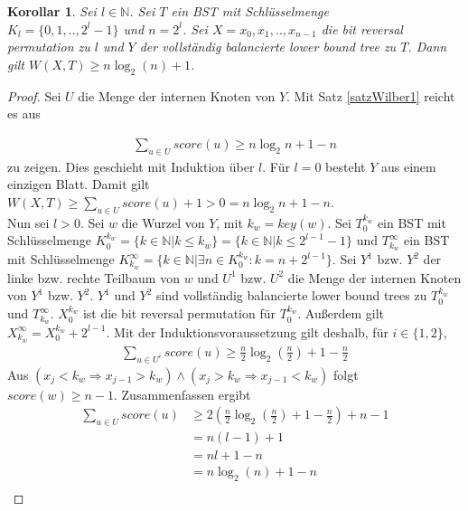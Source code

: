 \documentclass[a4paper,12pt]{article}
\begin{document}
\newtheorem{Korollar1}{Korollar}[section]
\begin{Korollar1} Sei $l \in \mathbb{N}$. Sei $T$ ein BST mit Schlüsselmenge\\ ${K_l = \{0,1,..,2^l -1\}}$ und $n = 2^l$. Sei $X = x_0, x_1,..,x_{n-1}$ die bit reversal permutation zu $l$ und $Y$ der vollständig balancierte lower bound tree zu $T$. Dann gilt  $W\left(X,T\right) \geq n \log_2 \left(n\right) + 1 $. 
\end{Korollar1}
\begin{proof}
	Sei $U$ die Menge der internen Knoten von $Y$. Mit Satz \ref{satzWilber1} reicht es aus 
	
	\begin{align*}
	\sum_{u \in U} {\mathit{score}\left(u\right)} \geq n \log_2 n + 1 - n 
	\end{align*} 
	zu zeigen. Dies geschieht mit Induktion über $l$. Für $l = 0$ besteht $Y$ aus einem einzigen Blatt. Damit gilt\\ $ W\left(X,T\right) \geq  \sum_{u \in U} {\mathit{score}\left(u\right)} + 1  > 0 = n \log_2 n + 1 - n $. \\
	Nun sei $l > 0$. Sei $w$ die Wurzel von $Y$, mit $k_w = \mathit{key}(w)$. Sei $T_0^{k_w}$ ein BST mit Schlüsselmenge $K_0^{k_w} =\{k \in \mathbb{N}\vert k \leq k_w\} = \{k \in \mathbb{N}\vert k \leq 2^{l-1} - 1\}$ und $T_{k_w}^\infty$ ein BST mit Schlüsselmenge  $ K^\infty_{k_w} = \{k \in \mathbb{N}\vert \exists n \in K_0^{k_w}\colon  k = n + 2^{l-1}\}$. Sei $Y^1$ bzw. $Y^2$ der linke bzw. rechte Teilbaum von $w$ und $U^1$ bzw. $U^2$ die Menge der internen Knoten von $Y^1$ bzw. $Y^2$. $Y^1$ und $Y^2$ sind vollständig balancierte lower bound trees zu $T_0^{k_w}$ und $T_{k_w}^\infty$. $X^{k_w}_0$ ist die bit reversal permutation für $T_0^{k_w}$. Außerdem gilt $X_{k_w}^\infty = X^{k_w}_0 + 2^{l-1}$. Mit der Induktionsvoraussetzung gilt deshalb, für $i \in \{1,2\}$,
	\begin{align*}
	\sum_{u \in U^i} {\mathit{score}\left(u\right)} \geq  \frac{n}{2} \log_2 \left(\frac{n}{2} \right) + 1 - \frac{n}{2}  
	\end{align*}
	Aus $\left(x_j < k_w \Rightarrow x_{j-1} > k_w \right) \land \left(x_j > k_w \Rightarrow x_{j-1} < k_w \right)$ folgt $\mathit{score}\left(w\right) \geq n-1$. Zusammenfassen ergibt
	\begin{align*}
	\sum_{u \in U} {\mathit{score}\left(u\right)} &\geq 2 \left( \frac{n}{2}  \log_2 \left(\frac{n}{2} \right) + 1 - \frac{n}{2} \right) + n - 1\\	
	&= n (l-1)  + 1 \\	
	&= n l + 1 -n \\
	&= n \log_2\left( n\right) + 1 - n\\	
	\end{align*}
	
\end{proof}
\end{document}
